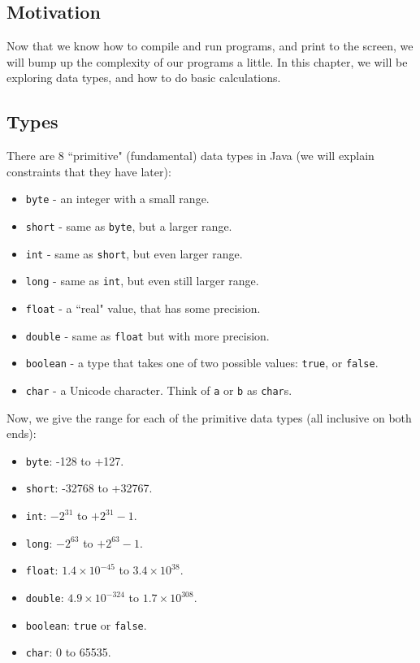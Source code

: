 
\subsection{Motivation}
Now that we know how to compile and run programs, and print to the screen, we will bump up the complexity of our programs a little. In this chapter, we will be exploring data types, and how to do basic calculations.

\subsection{Types}
There are 8 ``primitive" (fundamental) data types in Java (we will explain constraints that they have later):
\begin{itemize}
\item \verb|byte| - an integer with a small range.
\item \verb|short| - same as \verb|byte|, but a larger range.
\item \verb|int| - same as \verb|short|, but even larger range.
\item \verb|long| - same as \verb|int|, but even still larger range.
\item \verb|float| - a ``real" value, that has some precision.
\item \verb|double| - same as \verb|float| but with more precision.
\item \verb|boolean| - a type that takes one of two possible values: \verb|true|, or \verb|false|.
\item \verb|char| - a Unicode character. Think of \verb|a| or \verb|b| as \verb|char|s.
\end{itemize}

\noindent Now, we give the range for each of the primitive data types (all inclusive on both ends):
\begin{itemize}
\item \verb|byte|: -128 to +127.
\item \verb|short|: -32768 to +32767.
\item \verb|int|: $-2^{31}$ to $+2^{31}-1$.
\item \verb|long|: $-2^{63}$ to $+2^{63}-1$.
\item \verb|float|: $1.4 \times 10^{-45}$ to $3.4 \times 10^{38}$.
\item \verb|double|: $4.9 \times 10^{-324}$ to $1.7 \times 10^{308}$.
\item \verb|boolean|: \verb|true| or \verb|false|.
\item \verb|char|: 0 to 65535.
\end{itemize}

